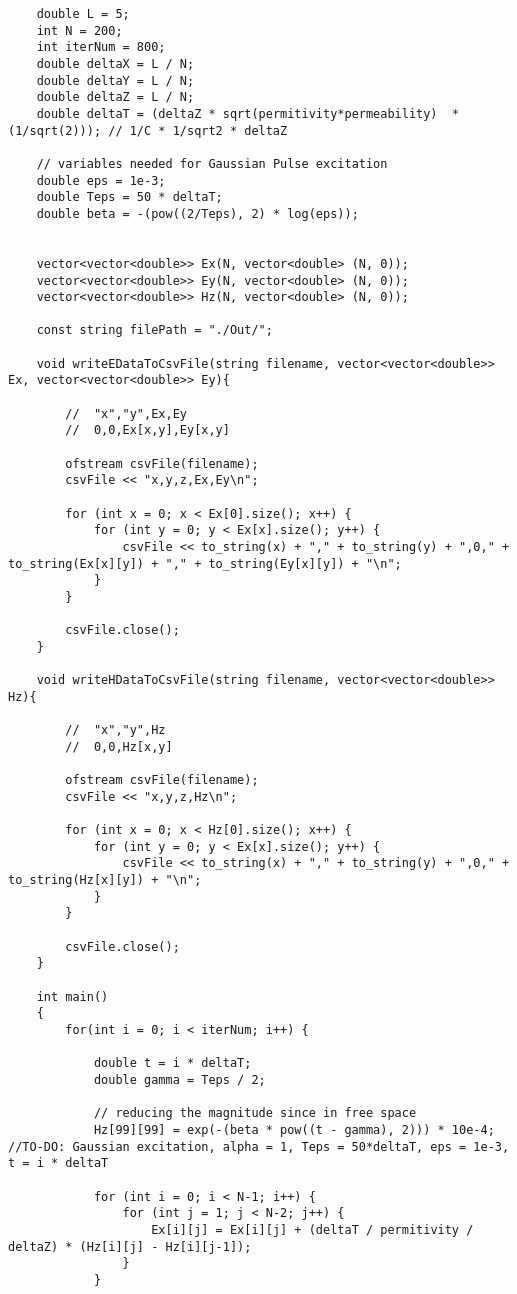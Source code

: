 \begin{verbatim}
	double L = 5;
	int N = 200;
	int iterNum = 800;
	double deltaX = L / N;
	double deltaY = L / N;
	double deltaZ = L / N;
	double deltaT = (deltaZ * sqrt(permitivity*permeability)  * (1/sqrt(2))); // 1/C * 1/sqrt2 * deltaZ
	
	// variables needed for Gaussian Pulse excitation
	double eps = 1e-3;
	double Teps = 50 * deltaT;
	double beta = -(pow((2/Teps), 2) * log(eps));
	
	
	vector<vector<double>> Ex(N, vector<double> (N, 0));
	vector<vector<double>> Ey(N, vector<double> (N, 0));
	vector<vector<double>> Hz(N, vector<double> (N, 0));
	
	const string filePath = "./Out/";
	
	void writeEDataToCsvFile(string filename, vector<vector<double>> Ex, vector<vector<double>> Ey){
		
		//	"x","y",Ex,Ey
		//	0,0,Ex[x,y],Ey[x,y]
		
		ofstream csvFile(filename);
		csvFile << "x,y,z,Ex,Ey\n";
		
		for (int x = 0; x < Ex[0].size(); x++) {
			for (int y = 0; y < Ex[x].size(); y++) {
				csvFile << to_string(x) + "," + to_string(y) + ",0," + to_string(Ex[x][y]) + "," + to_string(Ey[x][y]) + "\n";
			}
		}
		
		csvFile.close();
	}
	
	void writeHDataToCsvFile(string filename, vector<vector<double>> Hz){
		
		//	"x","y",Hz
		//	0,0,Hz[x,y]
		
		ofstream csvFile(filename);
		csvFile << "x,y,z,Hz\n";
		
		for (int x = 0; x < Hz[0].size(); x++) {
			for (int y = 0; y < Ex[x].size(); y++) {
				csvFile << to_string(x) + "," + to_string(y) + ",0," + to_string(Hz[x][y]) + "\n";
			}
		}
		
		csvFile.close();
	}
	
	int main()
	{
		for(int i = 0; i < iterNum; i++) {
			
			double t = i * deltaT;
			double gamma = Teps / 2;
			
			// reducing the magnitude since in free space
			Hz[99][99] = exp(-(beta * pow((t - gamma), 2))) * 10e-4;  //TO-DO: Gaussian excitation, alpha = 1, Teps = 50*deltaT, eps = 1e-3, t = i * deltaT
			
			for (int i = 0; i < N-1; i++) {
				for (int j = 1; j < N-2; j++) {
					Ex[i][j] = Ex[i][j] + (deltaT / permitivity / deltaZ) * (Hz[i][j] - Hz[i][j-1]);
				}
			}
			

\end{verbatim}
